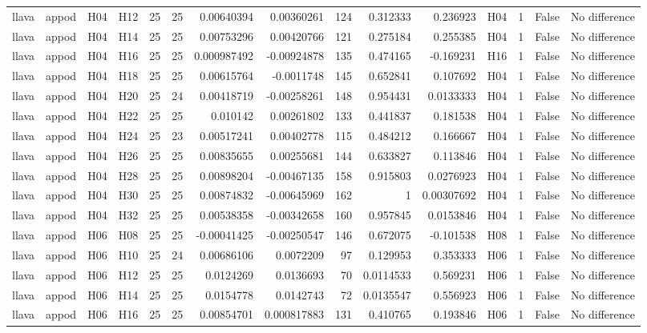 \begin{longtable}{llllrrrrrrrlrrl}
llava & appod & H04 & H12 & 25 & 25 & 0.00640394 & 0.00360261 & 124 & 0.312333 & 0.236923 & H04 & 1 & False & No difference \\
llava & appod & H04 & H14 & 25 & 25 & 0.00753296 & 0.00420766 & 121 & 0.275184 & 0.255385 & H04 & 1 & False & No difference \\
llava & appod & H04 & H16 & 25 & 25 & 0.000987492 & -0.00924878 & 135 & 0.474165 & -0.169231 & H16 & 1 & False & No difference \\
llava & appod & H04 & H18 & 25 & 25 & 0.00615764 & -0.0011748 & 145 & 0.652841 & 0.107692 & H04 & 1 & False & No difference \\
llava & appod & H04 & H20 & 25 & 24 & 0.00418719 & -0.00258261 & 148 & 0.954431 & 0.0133333 & H04 & 1 & False & No difference \\
llava & appod & H04 & H22 & 25 & 25 & 0.010142 & 0.00261802 & 133 & 0.441837 & 0.181538 & H04 & 1 & False & No difference \\
llava & appod & H04 & H24 & 25 & 23 & 0.00517241 & 0.00402778 & 115 & 0.484212 & 0.166667 & H04 & 1 & False & No difference \\
llava & appod & H04 & H26 & 25 & 25 & 0.00835655 & 0.00255681 & 144 & 0.633827 & 0.113846 & H04 & 1 & False & No difference \\
llava & appod & H04 & H28 & 25 & 25 & 0.00898204 & -0.00467135 & 158 & 0.915803 & 0.0276923 & H04 & 1 & False & No difference \\
llava & appod & H04 & H30 & 25 & 25 & 0.00874832 & -0.00645969 & 162 & 1 & 0.00307692 & H04 & 1 & False & No difference \\
llava & appod & H04 & H32 & 25 & 25 & 0.00538358 & -0.00342658 & 160 & 0.957845 & 0.0153846 & H04 & 1 & False & No difference \\
llava & appod & H06 & H08 & 25 & 25 & -0.00041425 & -0.00250547 & 146 & 0.672075 & -0.101538 & H08 & 1 & False & No difference \\
llava & appod & H06 & H10 & 25 & 24 & 0.00686106 & 0.0072209 & 97 & 0.129953 & 0.353333 & H06 & 1 & False & No difference \\
llava & appod & H06 & H12 & 25 & 25 & 0.0124269 & 0.0136693 & 70 & 0.0114533 & 0.569231 & H06 & 1 & False & No difference \\
llava & appod & H06 & H14 & 25 & 25 & 0.0154778 & 0.0142743 & 72 & 0.0135547 & 0.556923 & H06 & 1 & False & No difference \\
llava & appod & H06 & H16 & 25 & 25 & 0.00854701 & 0.000817883 & 131 & 0.410765 & 0.193846 & H06 & 1 & False & No difference \\

\end{longtable}
